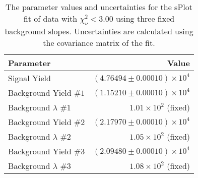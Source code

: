 
\begin{table}[ht]
    \begin{center}
        \begin{tabular}{lr}\toprule
            Parameter & Value \\\midrule
            Signal Yield & $(4.76494 \pm 0.00010) \times 10^{4}$ \\
            Background Yield $\#1$ & $(1.15210 \pm 0.00010) \times 10^{4}$ \\
            Background $\lambda$ $\#1$ & $1.01 \times 10^{2}$ (fixed) \\
            Background Yield $\#2$ & $(2.17970 \pm 0.00010) \times 10^{4}$ \\
            Background $\lambda$ $\#2$ & $1.05 \times 10^{2}$ (fixed) \\
            Background Yield $\#3$ & $(2.09480 \pm 0.00010) \times 10^{4}$ \\
            Background $\lambda$ $\#3$ & $1.08 \times 10^{2}$ (fixed) \\\bottomrule
        \end{tabular}
        \caption{The parameter values and uncertainties for the sPlot fit of data with $\chi^2_\nu < 3.00$ using three fixed background slopes. Uncertainties are calculated using the covariance matrix of the fit.}\label{tab:splot-fit-results-chisqdof-3.00-fixed-3}
    \end{center}
\end{table}
